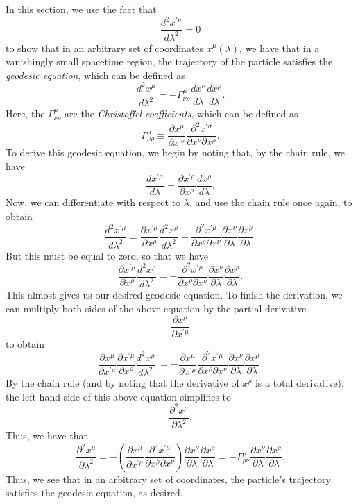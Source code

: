 \documentclass[12pt]{article}
\theoremstyle{definition}
\theoremstyle{remark}
\begin{document}
In this section, we use the fact that 
\[
\frac{d^2 x^{ \prime \mu}}{d \lambda^2} = 0
\]
to show that in an arbitrary set of coordinates $x^{\mu}(\lambda)$, we have that in a vanishingly small spacetime region, the trajectory of the particle satisfies the \textit{geodesic equation}, which can be defined as
\[
\frac{ d^2 x^{ \mu } }{d \lambda^2 } = 
- \Gamma^{ \mu }_{ \nu \rho } 
\frac{d x^{\nu} }{ d \lambda } 
\frac{ d x^{ \rho } }{d \lambda} . 
\]
Here, the $\Gamma^{\mu}_{\nu \rho}$ are the \textit{Christoffel coefficients}, which can be defined as 
\[
\Gamma_{ \nu \rho }^{ \mu } \equiv 
\frac{ \partial x^{ \mu } }{ \partial x^{ \prime \sigma } }
\frac{ \partial^2 x^{ \prime \sigma } }{ \partial x^{ \nu } \partial x^{ \rho } }.
\]
To derive this geodesic equation, we begin by noting that, by the chain rule, we have
\[
\frac{ d x^{ \prime \mu } }{ d \lambda } = 
\frac{  \partial x^{ \prime \mu} }{ \partial x^{ \rho } } 
\frac{ d x^{ \rho } }{ d \lambda }.
\]
Now, we can differentiate with respect to $\lambda$, and use the chain rule once again, to obtain 
\[
\frac{ d^2 x^{ \prime \mu } }{ d \lambda^2 } = 
\frac{ \partial x^{ \prime \mu } }{ \partial x^{ \rho } } 
\frac{ d^2 x^{ \rho } }{ d \lambda^2 }
+ 
\frac{ \partial^2 x^{ \prime \mu } }{\partial x^{ \rho } \partial x^{ \nu } }
\frac{ \partial x^{ \nu } }{ \partial \lambda }
\frac{ \partial x^{ \rho } }{\partial \lambda } .
\]
But this must be equal to zero, so that we have 
\[
\frac{ \partial x^{ \prime \mu } }{ \partial x^{ \rho } } 
\frac{ d^2 x^{ \rho } }{ d \lambda^2 } 
=
-
\frac{ \partial^2 x^{ \prime \mu } }{\partial x^{ \rho } \partial x^{ \nu } }
\frac{ \partial x^{ \nu } }{ \partial \lambda }
\frac{ \partial x^{ \rho } }{\partial \lambda }.
\]
This almost gives us our desired geodesic equation.  To finish the derivation, we can multiply both sides of the above equation by the partial derivative
\[
\frac{ \partial x^{ \mu } }{ \partial x^{ \prime \mu } }
\]
to obtain
\[
\frac{ \partial x^{ \mu } }{ \partial x^{ \prime \mu } }
\frac{ \partial x^{ \prime \mu } }{ \partial x^{ \rho } } 
\frac{ d^2 x^{ \rho } }{ d \lambda^2 } \
=
-
\frac{ \partial x^{ \mu } }{ \partial x^{ \prime \mu } }
\frac{ \partial^2 x^{ \prime \mu } }{\partial x^{ \rho } \partial x^{ \nu } }
\frac{ \partial x^{ \nu } }{ \partial \lambda }
\frac{ \partial x^{ \rho } }{\partial \lambda }.
\]
By the chain rule (and by noting that the derivative of $x^{ \rho}$ is a total derivative), the left hand side of this above equation simplifies to 
\[
\frac{ \partial^2 x^{ \mu } }{ \partial \lambda^2 }.
\]
Thus, we have that 
\[
\frac{ \partial^2 x^{ \mu } }{ \partial \lambda^2 }
= 
-
\left( 
\frac{ \partial x^{ \mu } }{ \partial x^{ \prime \mu } }
\frac{ \partial^2 x^{ \prime \mu } }{\partial x^{ \rho } \partial x^{ \nu } }
\right)
\frac{ \partial x^{ \nu } }{ \partial \lambda }
\frac{ \partial x^{ \rho } }{\partial \lambda }
=
-
\Gamma^{\mu}_{\rho \nu} 
\frac{ \partial x^{ \nu } }{ \partial \lambda }
\frac{ \partial x^{ \rho } }{\partial \lambda }.
\]
Thus, we see that in an arbitrary set of coordinates, the particle's trajectory satisfies the geodesic equation, as desired.  
\end{document}
